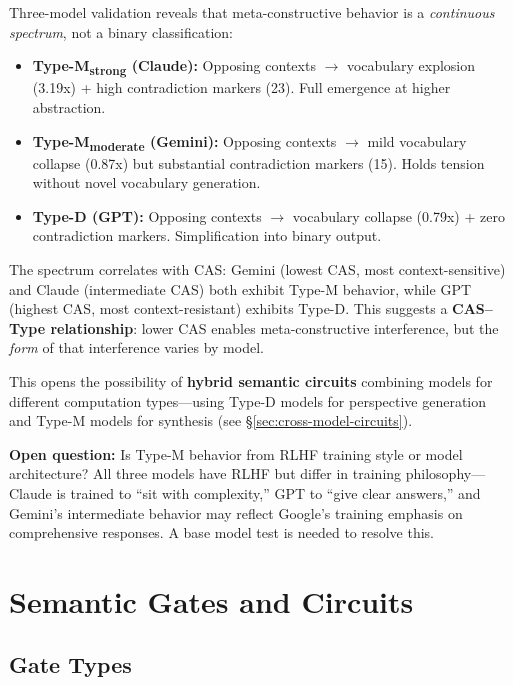 \documentclass[11pt,a4paper]{article}
\begin{document}
Three-model validation reveals that meta-constructive behavior is a \emph{continuous spectrum}, not a binary classification:
\begin{itemize}
\item \textbf{Type-M\textsubscript{strong} (Claude):} Opposing contexts $\to$ vocabulary explosion (3.19x) + high contradiction markers (23). Full emergence at higher abstraction.
\item \textbf{Type-M\textsubscript{moderate} (Gemini):} Opposing contexts $\to$ mild vocabulary collapse (0.87x) but substantial contradiction markers (15). Holds tension without novel vocabulary generation.
\item \textbf{Type-D (GPT):} Opposing contexts $\to$ vocabulary collapse (0.79x) + zero contradiction markers. Simplification into binary output.
\end{itemize}

The spectrum correlates with CAS: Gemini (lowest CAS, most context-sensitive) and Claude (intermediate CAS) both exhibit Type-M behavior, while GPT (highest CAS, most context-resistant) exhibits Type-D. This suggests a \textbf{CAS--Type relationship}: lower CAS enables meta-constructive interference, but the \emph{form} of that interference varies by model.

This opens the possibility of \textbf{hybrid semantic circuits} combining models for different computation types---using Type-D models for perspective generation and Type-M models for synthesis (see \S\ref{sec:cross-model-circuits}).

\textbf{Open question:} Is Type-M behavior from RLHF training style or model architecture? All three models have RLHF but differ in training philosophy---Claude is trained to ``sit with complexity,'' GPT to ``give clear answers,'' and Gemini's intermediate behavior may reflect Google's training emphasis on comprehensive responses. A base model test is needed to resolve this.

\section{Semantic Gates and Circuits}

\subsection{Gate Types}
\end{document}
